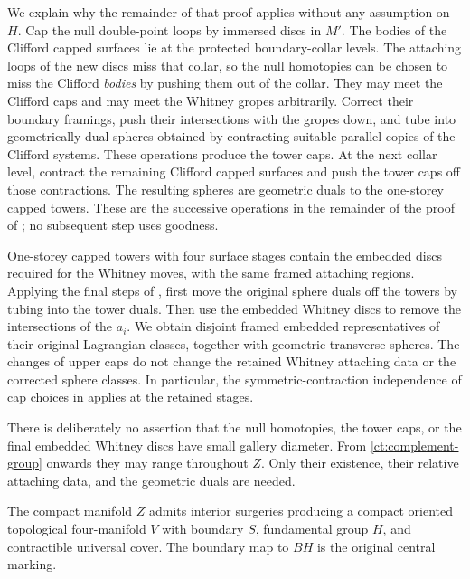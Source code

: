 We explain why the remainder of that proof applies without any
assumption on $H$.  Cap the null double-point loops by immersed
discs in $M'$.  The bodies of the Clifford capped surfaces lie at
the protected boundary-collar levels.  The attaching loops of the
new discs miss that collar, so the null homotopies can be chosen
to miss the Clifford \emph{bodies} by pushing them out of the
collar.  They may meet the Clifford caps and may meet the Whitney
gropes arbitrarily.  Correct their boundary framings, push their
intersections with the gropes down, and tube into geometrically
dual spheres obtained by contracting suitable parallel copies of
the Clifford systems.  These operations produce the tower caps.
At the next collar level, contract the remaining Clifford capped
surfaces and push the tower caps off those contractions.  The
resulting spheres are geometric duals to the one-storey capped
towers.  These are the successive operations in the remainder of
the proof of \cite[Lemma~4.2]{PRT}; no subsequent step uses goodness.

One-storey capped towers with four surface stages contain the
embedded discs required for the Whitney moves, with the same
framed attaching regions.  Applying the final steps of
\cite[Section~5]{PRT}, first move the original sphere duals off the
towers by tubing into the tower duals.  Then use the embedded
Whitney discs to remove the intersections of the $a_i$.  We obtain
disjoint framed embedded representatives of their original
Lagrangian classes, together with geometric transverse spheres.
The changes of upper caps do not change the retained Whitney
attaching data or the corrected sphere classes.  In particular,
the symmetric-contraction independence of cap choices in
\cite[Lemma~3.4]{PRT} applies at the retained stages.

There is deliberately no assertion that the null homotopies, the
tower caps, or the final embedded Whitney discs have small gallery
diameter.  From \eqref{ct:complement-group} onwards they may range
throughout $Z$.  Only their existence, their relative attaching
data, and the geometric duals are needed.

\begin{proposition}\label{ct:removal}
The compact manifold $Z$ admits interior surgeries producing a
compact oriented topological four-manifold $V$ with boundary $S$,
fundamental group $H$, and contractible universal cover.  The
boundary map to $BH$ is the original central marking.
\end{proposition}

